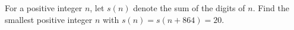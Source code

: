 For a positive integer $n$, let $s(n)$ denote the sum of the digits of $n$. Find the smallest positive integer $n$ with $s(n)=s(n+864)=20$.
